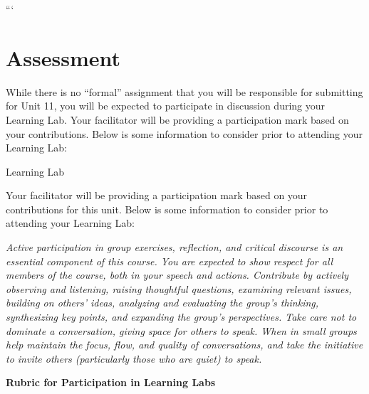 \documentclass[
]{book}
\begin{document}
```

\hypertarget{assessment-10}{%
\section*{Assessment}\label{assessment-10}}

\begin{assessment}
While there is no ``formal'' assignment that you will be responsible for submitting for Unit 11, you will be expected to participate in discussion during your Learning Lab. Your facilitator will be providing a participation mark based on your contributions. Below is some information to consider prior to attending your Learning Lab:

{Learning Lab}

Your facilitator will be providing a participation mark based on your contributions for this unit. Below is some information to consider prior to attending your Learning Lab:

\emph{Active participation in group exercises, reflection, and critical discourse is an essential component of this course. You are expected to show respect for all members of the course, both in your speech and actions. Contribute by actively observing and listening, raising thoughtful questions, examining relevant issues, building on others' ideas, analyzing and evaluating the group's thinking, synthesizing key points, and expanding the group's perspectives. Take care not to dominate a conversation, giving space for others to speak. When in small groups help maintain the focus, flow, and quality of conversations, and take the initiative to invite others (particularly those who are quiet) to speak.}

\textbf{Rubric for Participation in Learning Labs}


\end{assessment}
\end{document}
